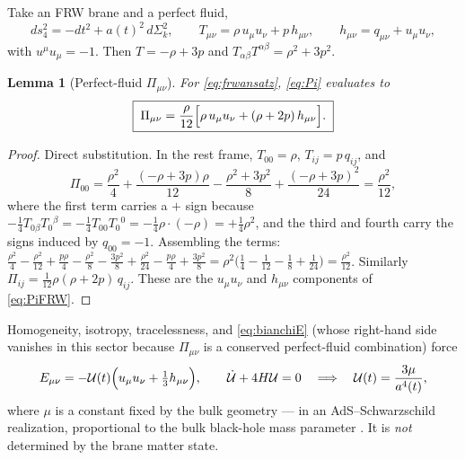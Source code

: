 \documentclass[11pt,a4paper]{article}
\theoremstyle{plain}
\newtheorem{lemma}[theorem]{Lemma}
\theoremstyle{definition}
\begin{document}
Take an FRW brane and a perfect fluid,
\begin{equation}
\label{eq:frwansatz}
ds_4^2=-dt^2+a(t)^2\,d\Sigma_k^2,
\qquad
T_{\mu\nu}=\rho\,u_\mu u_\nu+p\,h_{\mu\nu},
\qquad
h_{\mu\nu}=q_{\mu\nu}+u_\mu u_\nu,
\end{equation}
with $u^\mu u_\mu=-1$. Then $T=-\rho+3p$ and
$T_{\alpha\beta}T^{\alpha\beta}=\rho^2+3p^2$.

\begin{lemma}[Perfect-fluid $\Pi_{\mu\nu}$]
\label{lem:PiFRW}
For \eqref{eq:frwansatz}, \eqref{eq:Pi} evaluates to
\begin{equation}
\label{eq:PiFRW}
\boxed{\;
\Pi_{\mu\nu}
=\frac{\rho}{12}\Bigl[\rho\,u_\mu u_\nu+(\rho+2p)\,h_{\mu\nu}\Bigr].
\;}
\end{equation}
\end{lemma}

\begin{proof}
Direct substitution. In the rest frame, $T_{00}=\rho$,
$T_{ij}=p\,q_{ij}$, and
\begin{equation}
\Pi_{00}
=\frac{\rho^2}{4}
+\frac{(-\rho+3p)\rho}{12}
-\frac{\rho^2+3p^2}{8}
+\frac{(-\rho+3p)^2}{24}
=\frac{\rho^2}{12},
\end{equation}
where the first term carries a $+$ sign because
$-\tfrac14T_{0\beta}T_0{}^\beta
=-\tfrac14 T_{00}T_0{}^0=-\tfrac14\rho\cdot(-\rho)=+\tfrac14\rho^2$,
and the third and fourth carry the signs induced by $q_{00}=-1$.
Assembling the terms:
$\tfrac{\rho^2}{4}
-\tfrac{\rho^2}{12}+\tfrac{p\rho}{4}
-\tfrac{\rho^2}{8}-\tfrac{3p^2}{8}
+\tfrac{\rho^2}{24}-\tfrac{p\rho}{4}+\tfrac{3p^2}{8}
=\rho^2\bigl(\tfrac14-\tfrac1{12}-\tfrac18+\tfrac1{24}\bigr)
=\tfrac{\rho^2}{12}$.
Similarly $\Pi_{ij}=\tfrac{1}{12}\rho(\rho+2p)\,q_{ij}$. These are the
$u_\mu u_\nu$ and $h_{\mu\nu}$ components of \eqref{eq:PiFRW}.
\end{proof}

Homogeneity, isotropy, tracelessness, and \eqref{eq:bianchiE} (whose
right-hand side vanishes in this sector because $\Pi_{\mu\nu}$ is a
conserved perfect-fluid combination) force
\begin{equation}
\label{eq:EFRW}
E_{\mu\nu}=-\mathcal U(t)\Bigl(u_\mu u_\nu+\tfrac13h_{\mu\nu}\Bigr),
\qquad
\dot{\mathcal U}+4H\mathcal U=0
\quad\Longrightarrow\quad
\mathcal U(t)=\frac{3\mu}{a^4(t)} ,
\end{equation}
where $\mu$ is a constant fixed by the bulk geometry --- in an
AdS--Schwarzschild realization, proportional to the bulk black-hole mass
parameter \cite{Mukohyama1,BDEL}. It is \emph{not} determined by the
brane matter state.
\end{document}
